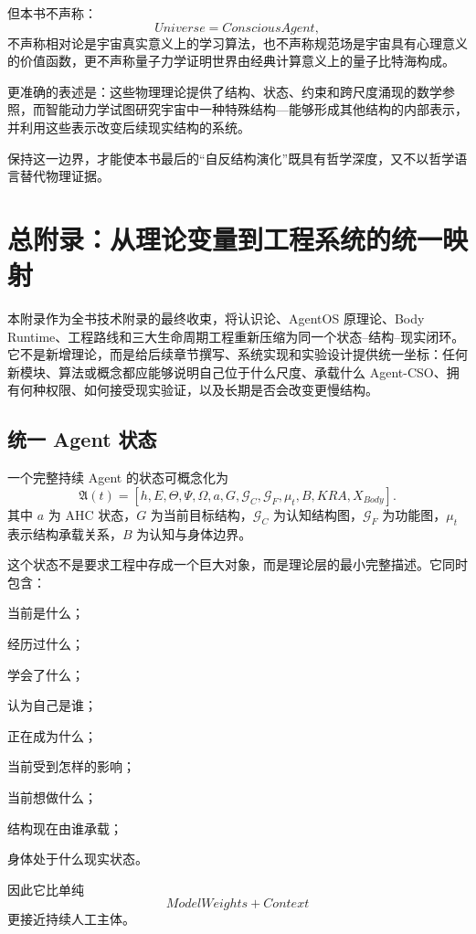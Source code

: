 但本书不声称：
\[
Universe=ConsciousAgent,
\]
不声称相对论是宇宙真实意义上的学习算法，也不声称规范场是宇宙具有心理意义的价值函数，更不声称量子力学证明世界由经典计算意义上的量子比特海构成。

更准确的表述是：这些物理理论提供了结构、状态、约束和跨尺度涌现的数学参照，而智能动力学试图研究宇宙中一种特殊结构---能够形成其他结构的内部表示，并利用这些表示改变后续现实结构的系统。

保持这一边界，才能使本书最后的“自反结构演化”既具有哲学深度，又不以哲学语言替代物理证据。


\chapter{总附录：从理论变量到工程系统的统一映射}
\label{app:finalmap}

\begin{chapterlead}
本附录作为全书技术附录的最终收束，将认识论、AgentOS 原理论、Body Runtime、工程路线和三大生命周期工程重新压缩为同一个状态--结构--现实闭环。它不是新增理论，而是给后续章节撰写、系统实现和实验设计提供统一坐标：任何新模块、算法或概念都应能够说明自己位于什么尺度、承载什么 Agent-CSO、拥有何种权限、如何接受现实验证，以及长期是否会改变更慢结构。
\end{chapterlead}

\section{统一 Agent 状态}

一个完整持续 Agent 的状态可概念化为
\[
\mathfrak A(t)
=
[
h,
E,
\Theta,
\Psi,
\Omega,
a,
G,
\mathcal G_C,
\mathcal G_F,
\mu_t,
B,
KRA,
X_{Body}
].
\]
其中 $a$ 为 AHC 状态，$G$ 为当前目标结构，$\mathcal G_C$ 为认知结构图，$\mathcal G_F$ 为功能图，$\mu_t$ 表示结构承载关系，$B$ 为认知与身体边界。

这个状态不是要求工程中存成一个巨大对象，而是理论层的最小完整描述。它同时包含：

当前是什么；

经历过什么；

学会了什么；

认为自己是谁；

正在成为什么；

当前受到怎样的影响；

当前想做什么；

结构现在由谁承载；

身体处于什么现实状态。

因此它比单纯
\[
ModelWeights+Context
\]
更接近持续人工主体。

